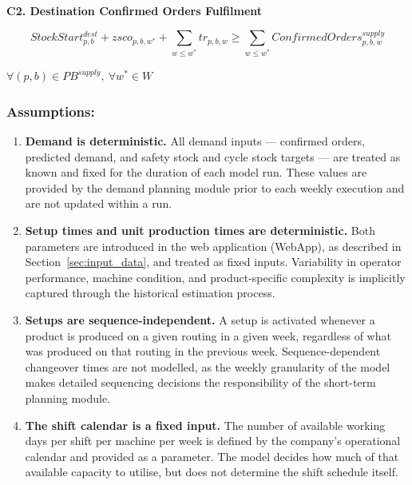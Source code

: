 \documentclass{article}
\begin{document}
\noindent\textbf{C2. Destination Confirmed Orders Fulfilment}

\begin{equation}
StockStart^{dest}_{p,b}
+ zsco_{p,b,w^*}
+ \sum_{w \leq w^*} tr_{p,b,w}
\geq
\sum_{w \leq w^*} ConfirmedOrders^{supply}_{p,b,w}
\label{eq:C2_dest_confirmed_orders}
\end{equation}
\begin{center}
$
\forall (p,b) \in PB^{supply},\ \forall w^* \in W
$
\end{center}

    
\subsubsection{Assumptions:}

\begin{enumerate}
    \item \textbf{Demand is deterministic.} All demand inputs --- confirmed orders, predicted demand, and safety stock and cycle stock targets --- are treated as known and fixed for the duration of each model run. These values are provided by the demand planning module prior to each weekly execution and are not updated within a run.

    \item \textbf{Setup times and unit production times are deterministic.} Both parameters are introduced in the web application (WebApp), as described in Section~\ref{sec:input_data}, and treated as fixed inputs. Variability in operator performance, machine condition, and product-specific complexity is implicitly captured through the historical estimation process.

    \item \textbf{Setups are sequence-independent.} A setup is activated whenever a product is produced on a given routing in a given week, regardless of what was produced on that routing in the previous week. Sequence-dependent changeover times are not modelled, as the weekly granularity of the model makes detailed sequencing decisions the responsibility of the short-term planning module.

    \item \textbf{The shift calendar is a fixed input.} The number of available working days per shift per machine per week is defined by the company's operational calendar and provided as 
    a parameter. The model decides how much of that available capacity to utilise, but does not determine the shift schedule itself.


\end{enumerate}
\end{document}
